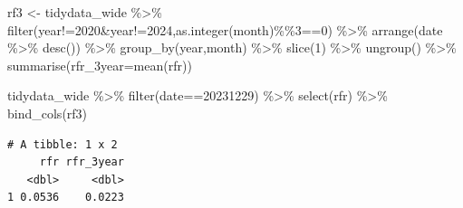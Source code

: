 \documentclass[
  letterpaper,
  DIV=11,
  numbers=noendperiod]{scrreprt}
\newenvironment{Shaded}{\begin{snugshade}}{\end{snugshade}}
\newcommand{\AttributeTok}[1]{\textcolor[rgb]{0.40,0.45,0.13}{#1}}
\newcommand{\DecValTok}[1]{\textcolor[rgb]{0.68,0.00,0.00}{#1}}
\newcommand{\FunctionTok}[1]{\textcolor[rgb]{0.28,0.35,0.67}{#1}}
\newcommand{\NormalTok}[1]{\textcolor[rgb]{0.00,0.23,0.31}{#1}}
\newcommand{\OtherTok}[1]{\textcolor[rgb]{0.00,0.23,0.31}{#1}}
\newcommand{\SpecialCharTok}[1]{\textcolor[rgb]{0.37,0.37,0.37}{#1}}
\begin{document}
\begin{Shaded}
\begin{Highlighting}[]
\NormalTok{rf3 }\OtherTok{\textless{}{-}}\NormalTok{ tidydata\_wide }\SpecialCharTok{\%\textgreater{}\%} 
  \FunctionTok{filter}\NormalTok{(year}\SpecialCharTok{!=}\DecValTok{2020}\SpecialCharTok{\&}\NormalTok{year}\SpecialCharTok{!=}\DecValTok{2024}\NormalTok{,}\FunctionTok{as.integer}\NormalTok{(month)}\SpecialCharTok{\%\%}\DecValTok{3}\SpecialCharTok{==}\DecValTok{0}\NormalTok{) }\SpecialCharTok{\%\textgreater{}\%} 
  \FunctionTok{arrange}\NormalTok{(date }\SpecialCharTok{\%\textgreater{}\%} \FunctionTok{desc}\NormalTok{()) }\SpecialCharTok{\%\textgreater{}\%} 
  \FunctionTok{group\_by}\NormalTok{(year,month) }\SpecialCharTok{\%\textgreater{}\%} 
  \FunctionTok{slice}\NormalTok{(}\DecValTok{1}\NormalTok{) }\SpecialCharTok{\%\textgreater{}\%} 
  \FunctionTok{ungroup}\NormalTok{() }\SpecialCharTok{\%\textgreater{}\%} 
  \FunctionTok{summarise}\NormalTok{(}\AttributeTok{rfr\_3year=}\FunctionTok{mean}\NormalTok{(rfr))}

\NormalTok{tidydata\_wide }\SpecialCharTok{\%\textgreater{}\%} \FunctionTok{filter}\NormalTok{(date}\SpecialCharTok{==}\DecValTok{20231229}\NormalTok{) }\SpecialCharTok{\%\textgreater{}\%} \FunctionTok{select}\NormalTok{(rfr) }\SpecialCharTok{\%\textgreater{}\%} \FunctionTok{bind\_cols}\NormalTok{(rf3)}
\end{Highlighting}
\end{Shaded}

\begin{verbatim}
# A tibble: 1 x 2
     rfr rfr_3year
   <dbl>     <dbl>
1 0.0536    0.0223
\end{verbatim}

\begin{Shaded}
\end{Shaded}
\end{document}
